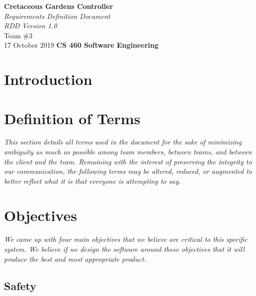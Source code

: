 \documentclass[12pt]{article}
\begin{document}
\begin{titlepage}
\begin{flushleft}
\vspace*{1cm}
\Huge
\textbf{Cretaceous Gardens Controller}\\
\vspace{1cm}
\Huge
\textit{Requirements Definition Document}\\
\vspace{1cm}
\Large
\textit{RDD Version 1.0}\\
\vspace{5cm}
\LARGE
Team \#3\\
17 October 2019
\vfill
\Huge
\textbf{CS 460 Software Engineering}
\end{flushleft}
\end{titlepage}
\normalsize
\tableofcontents
\newpage
\section{Introduction} %

\section{Definition of Terms} %
\label{def}
\textit{This section details all terms used in the document for the sake of minimizing ambiguity as much as possible among team members, between teams, and between the client and the team. Remaining with the interest of preserving the integrity to our communication, the following terms may be altered, reduced, or augmented to better reflect what it is that everyone is attempting to say.}
\pagebreak
	

\section{Objectives} 
\label{obj}
\paragraph{} \textit{We came up with four main objectives that we believe are critical to this specific system. We believe if we design the software around these objectives that it will produce the best  and most appropriate product.}
\subsection{Safety}\label{saf}
\end{document}
